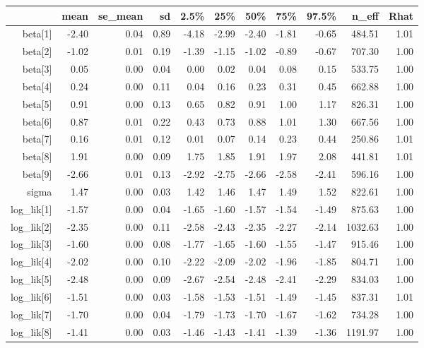 \begin{table}[ht]
\centering
\begin{tabular}{rrrrrrrrrrr}
  \hline
 & mean & se\_mean & sd & 2.5\% & 25\% & 50\% & 75\% & 97.5\% & n\_eff & Rhat \\ 
  \hline
beta[1] & -2.40 & 0.04 & 0.89 & -4.18 & -2.99 & -2.40 & -1.81 & -0.65 & 484.51 & 1.01 \\ 
  beta[2] & -1.02 & 0.01 & 0.19 & -1.39 & -1.15 & -1.02 & -0.89 & -0.67 & 707.30 & 1.00 \\ 
  beta[3] & 0.05 & 0.00 & 0.04 & 0.00 & 0.02 & 0.04 & 0.08 & 0.15 & 533.75 & 1.00 \\ 
  beta[4] & 0.24 & 0.00 & 0.11 & 0.04 & 0.16 & 0.23 & 0.31 & 0.45 & 662.88 & 1.00 \\ 
  beta[5] & 0.91 & 0.00 & 0.13 & 0.65 & 0.82 & 0.91 & 1.00 & 1.17 & 826.31 & 1.00 \\ 
  beta[6] & 0.87 & 0.01 & 0.22 & 0.43 & 0.73 & 0.88 & 1.01 & 1.30 & 667.56 & 1.00 \\ 
  beta[7] & 0.16 & 0.01 & 0.12 & 0.01 & 0.07 & 0.14 & 0.23 & 0.44 & 250.86 & 1.01 \\ 
  beta[8] & 1.91 & 0.00 & 0.09 & 1.75 & 1.85 & 1.91 & 1.97 & 2.08 & 441.81 & 1.01 \\ 
  beta[9] & -2.66 & 0.01 & 0.13 & -2.92 & -2.75 & -2.66 & -2.58 & -2.41 & 596.16 & 1.00 \\ 
  sigma & 1.47 & 0.00 & 0.03 & 1.42 & 1.46 & 1.47 & 1.49 & 1.52 & 822.61 & 1.00 \\ 
  log\_lik[1] & -1.57 & 0.00 & 0.04 & -1.65 & -1.60 & -1.57 & -1.54 & -1.49 & 875.63 & 1.00 \\ 
  log\_lik[2] & -2.35 & 0.00 & 0.11 & -2.58 & -2.43 & -2.35 & -2.27 & -2.14 & 1032.63 & 1.00 \\ 
  log\_lik[3] & -1.60 & 0.00 & 0.08 & -1.77 & -1.65 & -1.60 & -1.55 & -1.47 & 915.46 & 1.00 \\ 
  log\_lik[4] & -2.02 & 0.00 & 0.10 & -2.22 & -2.09 & -2.02 & -1.96 & -1.85 & 804.71 & 1.00 \\ 
  log\_lik[5] & -2.48 & 0.00 & 0.09 & -2.67 & -2.54 & -2.48 & -2.41 & -2.29 & 834.03 & 1.00 \\ 
  log\_lik[6] & -1.51 & 0.00 & 0.03 & -1.58 & -1.53 & -1.51 & -1.49 & -1.45 & 837.31 & 1.01 \\ 
  log\_lik[7] & -1.70 & 0.00 & 0.04 & -1.79 & -1.73 & -1.70 & -1.67 & -1.62 & 734.28 & 1.00 \\ 
  log\_lik[8] & -1.41 & 0.00 & 0.03 & -1.46 & -1.43 & -1.41 & -1.39 & -1.36 & 1191.97 & 1.00 \\ 

\end{tabular}
\end{table}
